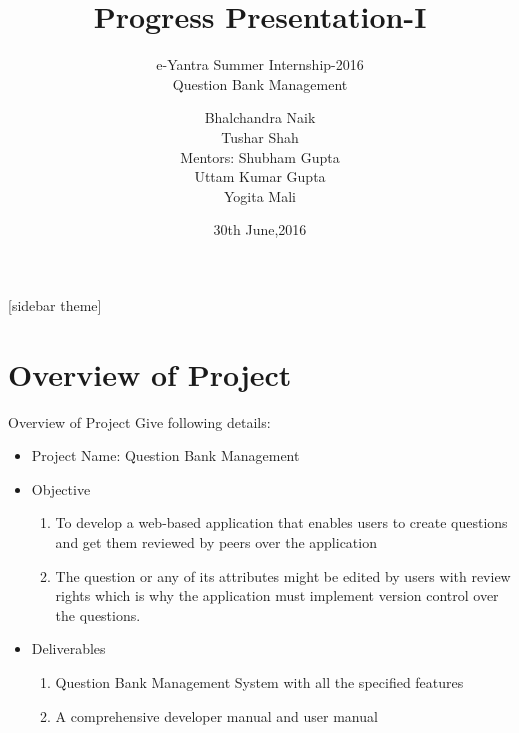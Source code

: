 \documentclass[10pt, a4paper]{beamer}
\begin{document}
	\title{Progress Presentation-I}
	\subtitle{e-Yantra Summer Internship-2016 \\ Question Bank Management}
	\author{Bhalchandra Naik\\Tushar Shah\\
	\vspace{5mm}
	Mentors: Shubham Gupta\\Uttam Kumar Gupta\\Yogita Mali\\}
	\date{30th June,2016}
	\frame{\titlepage}

[sidebar theme]

\section{Overview of Project}
\begin{frame}{Overview of Project}
	Give following details: \\
	\begin{itemize}
		\item Project Name: Question Bank Management	 \\
			
		\item Objective
			\begin{enumerate}
				\item To develop a web-based application that enables users to create questions and get them reviewed by peers over the application
				\item The question or any of its attributes might be edited by users with review rights which is why the application must implement version control over the questions.
			\end{enumerate}
		\item Deliverables
			\begin{enumerate}
				\item Question Bank Management System with all the specified features
				\item A comprehensive developer manual and user manual
			\end{enumerate}
	\end{itemize}
\end{frame}

\end{document}
